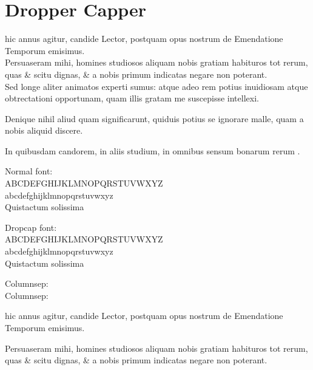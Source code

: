

\chapter[Dropcap]{Dropper Capper}

\setcounter{parcount}{0}
\begin{parnumbers}
 hic annus agitur, candide Lector, postquam opus nostrum de Emendatione Temporum emisimus.
\\ \p
Persuaseram mihi, homines studiosos aliquam nobis gratiam habituros tot rerum, quas \& scitu dignas, \& a nobis primum indicatas negare non poterant.
\\ \p
Sed longe aliter animatos experti sumus: atque adeo rem potius inuidiosam atque obtrectationi opportunam, quam illis gratam me suscepisse intellexi.

Denique nihil aliud quam significarunt, quiduis potius se ignorare malle, quam a nobis aliquid discere.

In quibusdam candorem, in aliis studium, in omnibus sensum bonarum rerum .

Normal font:\\
ABCDEFGHIJKLMNOPQRSTUVWXYZ\\
abcdefghijklmnopqrstuvwxyz\\
Quistactum solissima

Dropcap font:\\
{\dropcapfont
ABCDEFGHIJKLMNOPQRSTUVWXYZ\\
abcdefghijklmnopqrstuvwxyz\\
Quistactum solissima
}

\end{parnumbers}
Columnsep: \the\columnsep
\setlength{\columnsep}{30pt} \\
Columnsep: \the\columnsep

 hic annus agitur, candide Lector, postquam opus nostrum de Emendatione Temporum emisimus.

Persuaseram mihi, homines studiosos aliquam nobis gratiam habituros tot rerum, quas \& scitu dignas, \& a nobis primum indicatas negare non poterant.


